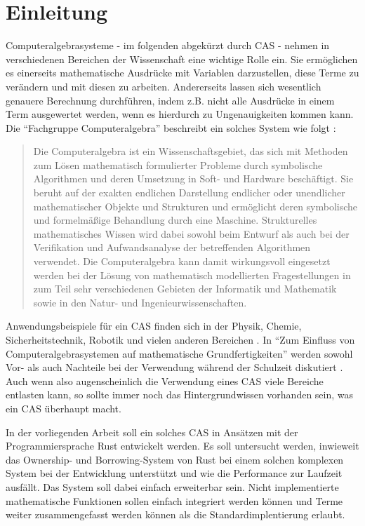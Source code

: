 \documentclass[11pt,a4paper, ngerman]{article}
\begin{document}
\section{Einleitung}
Computeralgebrasysteme - im folgenden abgekürzt durch CAS - nehmen in verschiedenen Bereichen der Wissenschaft eine wichtige Rolle ein. Sie ermöglichen es einerseits mathematische Ausdrücke mit Variablen darzustellen, diese Terme zu verändern und mit diesen zu arbeiten. Andererseits lassen sich wesentlich genauere Berechnung durchführen, indem z.B. nicht alle Ausdrücke in einem Term ausgewertet werden, wenn es hierdurch zu Ungenauigkeiten kommen kann. Die ``Fachgruppe Computeralgebra'' beschreibt ein solches System wie folgt \cite{FachgruppeDef}:
\begin{quote}
    Die Computeralgebra ist ein Wissenschaftsgebiet, das sich mit Methoden zum Lösen mathematisch formulierter Probleme durch symbolische Algorithmen und deren Umsetzung in Soft- und Hardware beschäftigt. Sie beruht auf der exakten endlichen Darstellung endlicher oder unendlicher mathematischer Objekte und Strukturen und ermöglicht deren symbolische und formelmäßige Behandlung durch eine Maschine. Strukturelles mathematisches Wissen wird dabei sowohl beim Entwurf als auch bei der Verifikation und Aufwandsanalyse der betreffenden Algorithmen verwendet. Die Computeralgebra kann damit wirkungsvoll eingesetzt werden bei der Lösung von mathematisch modellierten Fragestellungen in zum Teil sehr verschiedenen Gebieten der Informatik und Mathematik sowie in den Natur- und Ingenieurwissenschaften.
\end{quote}

Anwendungsbeispiele für ein CAS finden sich in der Physik, Chemie, Sicherheitstechnik, Robotik und vielen anderen Bereichen \cite{FachgruppeEinsatz}. In ``Zum Einfluss von Computeralgebrasystemen auf mathematische Grundfertigkeiten'' werden sowohl Vor- als auch Nachteile bei der Verwendung während der Schulzeit diskutiert \cite[S. 17 ff.]{RN18}. Auch wenn also augenscheinlich die Verwendung eines CAS viele Bereiche entlasten kann, so sollte immer noch das Hintergrundwissen vorhanden sein, was ein CAS überhaupt macht.

In der vorliegenden Arbeit soll ein solches CAS in Ansätzen mit der Programmiersprache Rust entwickelt werden. Es soll untersucht werden, inwieweit das Ownership- und Borrowing-System von Rust bei einem solchen komplexen System bei der Entwicklung unterstützt und wie die Performance zur Laufzeit ausfällt. Das System soll dabei einfach erweiterbar sein. Nicht implementierte mathematische Funktionen sollen einfach integriert werden können und Terme weiter zusammengefasst werden können als die Standardimplentierung erlaubt.
\end{document}

